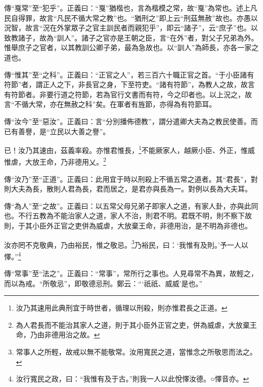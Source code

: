 {\noindent\zhuan{}\fzbyks 傳“戛常”至“犯乎”。正義曰：“戛”猶楷也，言為楷模之常，故“戛”為常也。述上凡民自得罪，故言“凡民不循大常之教”也。“猶刑之”即上云“刑茲無赦”故也。亦愚以況智，故言“況在外掌眾子之官主訓民者而親犯乎”，即云“諸子”，云“庶子”也。以致教諸子，故為“訓人”。諸子之官亦是王朝之臣，言“在外”者，對父子兄弟為外。惟舉庶子之官者，以其教訓公卿子弟，最為急故也。以“訓人”為師長，亦各一家之道也。 \par}

{\noindent\zhuan{}\fzbyks 傳“惟其”至“之科”。正義曰：“正官之人”，若三百六十職正官之首。“于小臣諸有符節”者，謂正人之下，非長官之身，下至符吏。“諸有符節”，為教人之故，故言有符節者。非要行道之符節，若為官行文書而有符，今之印者也。以上況之，故言“不循大常，亦在無赦之科”矣。在軍者有旌節，亦得為有符節耳。 \par}

{\noindent\zhuan{}\fzbyks 傳“汝今”至“惡汝”。正義曰：言“分別播佈德教”，謂分遣卿大夫為之教民使善。而已有善譽，是“立民以大善之譽”。 \par}

已！汝乃其速由，茲義率殺。亦惟君惟長，\footnote{汝乃其速用此典刑宜于時世者，循理以刑殺，則亦惟君長之正道。}不能厥家人，越厥小臣、外正，惟威惟虐，大放王命，乃非德用乂。\footnote{為人君長而不能治其家人之道，則于其小臣外正官之吏，併為威虐，大放棄王命，乃由非德用治之故。}


{\noindent\zhuan{}\fzbyks 傳“汝乃”至“正道”。正義曰：此用宜于時以刑殺上不循五常之道者。其“君長”，對則大夫為長，散則人君為長，君而居之，是君亦與長為一。對例以長為大夫耳。 \par}

{\noindent\zhuan{}\fzbyks 傳“為人”至“之故”。正義曰：以五常父母兄弟子即家人之道，有家人卦，亦與此同也。不行五教為不能治家人之道，家人不治，則君不明。君既不明，則不察下故則，于其小臣外正官之吏併為威虐，大放棄王命，非德用治，是不明為非德也。 \par}

汝亦罔不克敬典，乃由裕民，惟之敬忌。\footnote{常事人之所輕，故戒以無不能敬常。汝用寬民之道，當惟念之所敬思而法之。}乃裕民，曰：‘我惟有及則。’予一人以懌。”\footnote{汝行寬民之政，曰：“我惟有及于古。”則我一人以此悅懌汝德。○懌音亦。}

{\noindent\zhuan{}\fzbyks 傳“常事”至“法之”。正義曰：“常事”，常所行之事也。人見尋常不為異，故輕之，而以為戒。“所敬忌”，即敬德忌刑。鄭云：“‘祇祇、威威’是也。” \par}

